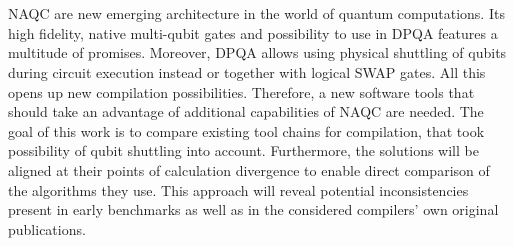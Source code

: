 \chapter{\abstractname}
\ac{NAQC} are new emerging architecture in the world of quantum computations. 
Its high fidelity, native multi-qubit gates and possibility to use in \ac{DPQA} features a multitude of promises.
Moreover, \ac{DPQA} allows using physical shuttling of qubits during circuit execution instead or together with logical SWAP gates. 
All this opens up new compilation possibilities. 
Therefore, a new software tools that should take an advantage of additional capabilities of \ac{NAQC} are needed.
The goal of this work is to compare existing tool chains for compilation, that took possibility of qubit shuttling into account.
Furthermore, the solutions will be aligned at their points of calculation divergence to enable direct comparison of the algorithms they use. 
This approach will reveal potential inconsistencies present in early benchmarks 
as well as in the considered compilers' own original publications.